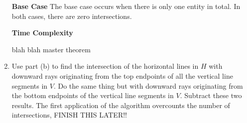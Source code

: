 \documentclass{article}
\begin{document}
\begin{solution}
\begin{enumerate}[label = (\alph*)]
    \textbf{Base Case}
    The base case occurs when there is only one entity in total. 
    In both cases, there are zero intersections.

    \textbf{Time Complexity}

    blah blah master theorem


    \item 
    Use part (b) to find the intersection of the horizontal lines in $H$ with downward rays originating from the top endpoints of all the vertical line segments in $V$.
    Do the same thing but with downward rays originating from the bottom endpoints of the vertical line segments in $V$. Subtract these two results.
    The first application of the algorithm overcounts the number of intersections, FINISH THIS LATER!!

\end{enumerate}
\end{solution}
\end{document}
